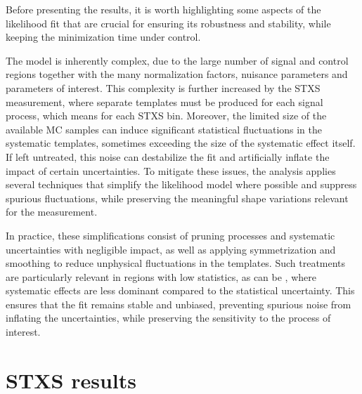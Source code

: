 Before presenting the results, it is worth highlighting some aspects of the likelihood fit that are crucial for ensuring its robustness and stability, while keeping the minimization time under control. 

The model is inherently complex, due to the large number of signal and control regions together with the many normalization factors, nuisance parameters and parameters of interest. 
This complexity is further increased by the STXS measurement, where separate templates must be produced for each signal process, which means for each STXS bin. 
Moreover, the limited size of the available MC samples can induce significant statistical fluctuations in the systematic templates, sometimes exceeding the size of the systematic effect itself. 
If left untreated, this noise can destabilize the fit and artificially inflate the impact of certain uncertainties. 
To mitigate these issues, the analysis applies several techniques that simplify the likelihood model where possible and suppress spurious fluctuations, while preserving the meaningful shape variations relevant for the measurement. 

In practice, these simplifications consist of pruning processes and systematic uncertainties with negligible impact, 
as well as applying symmetrization and smoothing to reduce unphysical fluctuations in the templates. 
Such treatments are particularly relevant in regions with low statistics, as can be \ttH, 
where systematic effects are less dominant compared to the statistical uncertainty. 
This ensures that the fit remains stable and unbiased, preventing spurious noise from inflating the uncertainties, 
while preserving the sensitivity to the process of interest.

\section{STXS results}
\label{sec:results_ttH}


